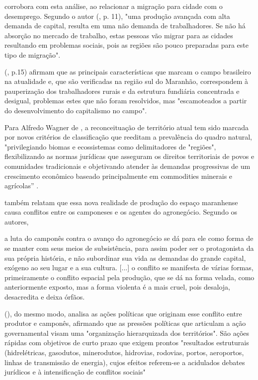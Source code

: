  corrobora com esta análise, ao relacionar a migração para cidade com o desemprego. Segundo o autor (\citeyear{studte2008}, p. 11), "uma produção avançada com alta demanda de capital, resulta em uma não demanda de trabalhadores. Se não há absorção no mercado de trabalho, estas pessoas vão migrar para as cidades resultando em problemas sociais, pois as regiões são pouco preparadas para este tipo de migração".

 (\citeyear{lima_locatel_silva}, p.15) afirmam que as principais características que marcam o campo brasileiro na atualidade e, que são verificadas na região sul do Maranhão, correspondem à pauperização dos trabalhadores rurais e da estrutura fundiária concentrada e desigual, problemas estes que não foram resolvidos, mas "escamoteados a partir do desenvolvimento do capitalismo no campo".

Para Alfredo Wagner de , a reconceituação de território atual tem sido marcada por novos critérios de classificação que reeditam a prevalência do quadro natural, "privilegiando biomas e ecossistemas como delimitadores de "regiões", flexibilizando as normas jurídicas que asseguram os direitos territoriais de povos e comunidades tradicionais e objetivando atender às demandas progressivas de um crescimento econômico baseado principalmente em commodities minerais e agrícolas” \cite{almeida}.

 também relatam que essa nova realidade de produção do espaço maranhense causa conflitos entre os camponeses e os agentes do agronegócio. Segundo os autores, 

\begin{citacao}
a luta do camponês contra o avanço do agronegócio se dá para ele como forma de se manter com seus meios de subsistência, para assim poder ser o protagonista da sua própria história, e não subordinar sua vida as demandas do grande capital, exógeno ao seu lugar e a sua cultura. [...] o conflito se manifesta de várias formas, primeiramente o conflito espacial pela produção, que se dá na forma velada, como anteriormente exposto, mas a forma violenta é a mais cruel, pois desaloja, desacredita e deixa órfãos. \cite[p. 10]{rodrigues_alencar}
\end{citacao}

 (\citeyear{almeida}), do mesmo modo, analisa as ações políticas que originam esse conflito entre produtor e camponês, afirmando que as pressões políticas que articulam a ação governamental visam uma "organização hierarquizada dos territórios". São ações rápidas com objetivos de curto prazo que exigem prontos "resultados estruturais (hidrelétricas, gasodutos, minerodutos, hidrovias, rodovias, portos, aeroportos, linhas de transmissão de energia), cujos efeitos referem-se a acidulados debates jurídicos e à intensificação de conflitos sociais" \cite{almeida}

